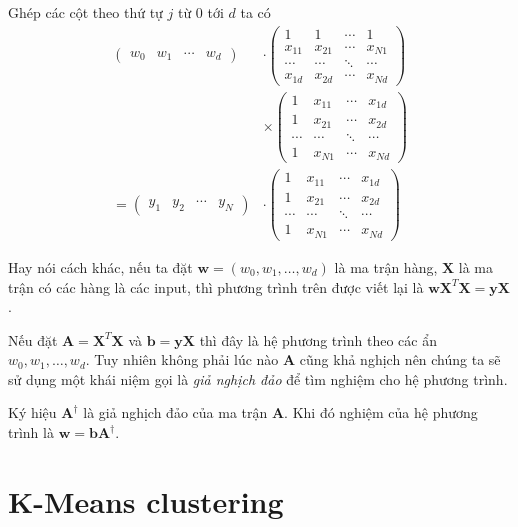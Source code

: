\documentclass{mynotes}
\begin{document}
Ghép các cột theo thứ tự $j$ từ 0 tới $d$ ta có
\begin{align*}
    \begin{pmatrix}
        w_0 & w_1 & \cdots & w_d
    \end{pmatrix} & \cdot \begin{pmatrix}
        1 & 1 & \cdots & 1 \\ x_{11} & x_{21} & \cdots & x_{N1} \\ \cdots & \cdots & \ddots & \cdots \\ x_{1d} & x_{2d} & \cdots & x_{Nd}
    \end{pmatrix} \\ & \times \begin{pmatrix}
        1 & x_{11} & \cdots & x_{1d} \\ 1 & x_{21} & \cdots & x_{2d} \\ \cdots & \cdots & \ddots & \cdots \\ 1 & x_{N1} & \cdots & x_{Nd}
    \end{pmatrix} \\ = \begin{pmatrix}
        y_1 & y_2 & \cdots & y_N
    \end{pmatrix} & \cdot \begin{pmatrix}
        1 & x_{11} & \cdots & x_{1d} \\ 1 & x_{21} & \cdots & x_{2d} \\ \cdots & \cdots & \ddots & \cdots \\ 1 & x_{N1} & \cdots & x_{Nd}
    \end{pmatrix}
\end{align*}

Hay nói cách khác, nếu ta đặt $\bm{w} = (w_0, w_1, \ldots, w_d)$ là ma trận hàng, $\bm{X}$ là ma trận có các hàng là các input, thì phương trình trên được viết lại là $\bm{w} \bm{X}^T \bm{X} = \bm{y} \bm{X}$.

Nếu đặt $\bm{A} = \bm{X}^T \bm{X}$ và $\bm{b} = \bm{y} \bm{X}$ thì đây là hệ phương trình theo các ẩn $w_0, w_1, \ldots, w_d$. Tuy nhiên không phải lúc nào $\bm{A}$ cũng khả nghịch nên chúng ta sẽ sử dụng một khái niệm gọi là \textit{giả nghịch đảo} để tìm nghiệm cho hệ phương trình.

Ký hiệu $\bm{A}^\dag$ là giả nghịch đảo của ma trận $\bm{A}$. Khi đó nghiệm của hệ phương trình là $\bm{w} = \bm{b} \bm{A}^\dag$.

\section{K-Means clustering}
\end{document}
